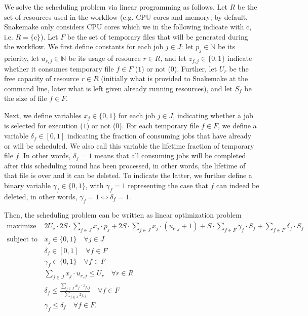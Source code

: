 \documentclass[parskip=half]{scrartcl}
\begin{document}
\newcommand{\N}{\mathbb{N}}
\newcommand{\cores}{\text{c}}

We solve the scheduling problem via linear programming as follows.
Let $R$ be the set of resources used in the workflow (e.g. CPU cores and memory; by default, Snakemake only considers CPU cores which we in the following indicate with $\cores$, i.e. $R = \{\cores\}$).
Let $F$ be the set of temporary files that will be generated during the workflow.
We first define constants for each job $j \in J$: let $p_j \in \N$ be its priority, let $u_{r,j} \in \N$ be its usage of resource $r \in R$, and let $z_{f,j} \in \{0,1\}$ indicate whether it consumes temporary file $f \in F$ ($1$) or not ($0$).
Further, let $U_r$ be the free capacity of resource $r \in R$ (initially what is provided to Snakemake at the command line, later what is left given already running resources), and let $S_f$ be the size of file $f \in F$.

Next, we define variables $x_j \in \{0,1\}$ for each job $j \in J$, indicating whether a job is selected for execution ($1$) or not ($0$).
For each temporary file $f \in F$, we define a variable $\delta_f \in [0,1]$ indicating the fraction of consuming jobs that have already or will be scheduled.
We also call this variable the lifetime fraction of temporary file $f$.
In other words, $\delta_f = 1$ means that all consuming jobs will be completed after this scheduling round has been processed, in other words, the lifetime of that file is over and it can be deleted.
To indicate the latter, we further define a binary variable $\gamma_f \in \{0,1\}$, with $\gamma_f = 1$ representing the case that $f$ can indeed be deleted, in other words, $\gamma_f = 1 \Leftrightarrow \delta_f = 1$.

Then, the scheduling problem can be written as linear optimization problem
\begin{align*}
	\text{maximize } & 2U_\cores \cdot 2S \cdot \sum_{j \in J} x_j \cdot p_j + 2S \cdot \sum_{j \in J} x_j \cdot (u_{\cores,j} + 1) + S \cdot \sum_{f \in F} \gamma_f \cdot S_f + \sum_{f \in F} \delta_f \cdot S_f \\ \text{subject to } & x_j \in \{0,1\} \quad \forall j \in J\\ \quad & \delta_f \in [0,1] \quad  \forall f \in F\\ \quad & \gamma_f \in \{0,1\} \quad \forall f \in F\\ \quad & \sum_{j \in J} x_j \cdot u_{r,j} \leq U_r \quad \forall r \in R\\ \quad & \delta_f \leq \frac{\sum_{j \in J} x_j \cdot z_{f,j}}{\sum_{j \in J} z_{f,j}} \quad\forall f \in F\\ \quad & \gamma_f \leq \delta_f \quad\forall f \in F.
\end{align*}
\end{document}
